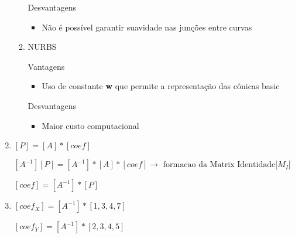 \begin{enumerate}
\begin{enumerate}[label=\alph*)]
		Desvantagens
		
		\begin{itemize}
			\item Não é possível garantir suavidade nas junções entre curvas
		\end{itemize}	
		
		\item NURBS
	
		Vantagens
		\begin{itemize}
			\item Uso de constante \textbf{w} que permite
			a representação das cônicas basic
		\end{itemize}				
		
		Desvantagens
		
		\begin{itemize}
			\item Maior custo computacional
		\end{itemize}	
		\end{enumerate}

		\item 
		
			$[P] = [A] * [coef]$ 

			$[A^{-1}][P] = [A^{-1}]*[A]*[coef] \rightarrow \text{ formacao da Matrix Identidade[$M_I$]}$ 

			$[coef] = [A^{-1}]*[P]$
		

		\item 
	
		$[coef_X] = [A^{-1}] * [1,3,4,7]$

		$[coef_Y] = [A^{-1}] * [2,3,4,5]$

		
	\end{enumerate}